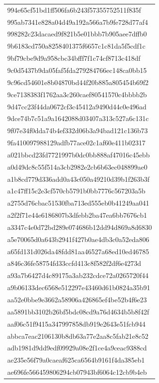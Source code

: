 \begin{tabular}{l}
994e65cf51bd1ff506fa6b243f57355752511f835f \\
995ab7341e828a04d49a192a566a7b9fe728d77af4 \\
998282c23dacaed9f821b5e01bbb7b905aee7dffb0 \\
9b6183cd750a8258401375f6657c1c81da5f5cdf1c \\
9bf79cbe9d9a958cbc34bfff7f1c74cf8713c418df \\
9c0d5437b9da05faf5fda279284766ec148ca0bb15 \\
9c96cd54601e8b04870bd44f20b885a805454b69f2 \\
9ce7138383f1762aa3c260caef80541570c4bbbb2b \\
9d47cc23f44da0672cf3c45412a9490d44c0e496ad \\
9dce74b7c51a9a1642088d03407a313c527a6c131c \\
9f07e34f0dda74b4ef332d06b3a94bad121c136b73 \\
9fa410097988129adfb77ace02c1af60e411b02317 \\
a021bbcd23fd7721997b0dc0bb888af47016c45ebb \\
a0d49dc8c55f514a3cb2982e2cb6b63ec048899ae0 \\
a1b8cd779d336add0a43c050a49210d39b1f263b3f \\
a1c47ff15c2e3cf570cb5791b0bb7776c567203a5b \\
a2755d76cbac51530fba713ed555eb0b41249aa041 \\
a2f2f71e44e6186807b3dfebb2ba47ea6bb7676cb1 \\
a3347c4e0d72bd289e074686b12dd94d869a8d6830 \\
a5e70065d0a643b2941f427b0ae4db3c0a52eda806 \\
a65fd131d026da48fdd81aa46527a68ed10ed46785 \\
a846c36fe58754fd33ccfd413c8f582f2df6e4273d \\
a93a7b6427d4c89175a3ab232cdce72a0265720f44 \\
a9b06133dec6568e512297e43460d61b0824a35b91 \\
aa52e0bbe9e3662a58906a426865ef4be52b4f6e23 \\
aa5891bb3102b26bf5bdc08cd9a76d4634b5b8f42f \\
aaf06c51f9415a347997858db919e2643e51fcb944 \\
abbca7eac2106130b8db63a77e2aa8c5fab21e8c52 \\
adb1981d9dd9edf09929a08e2f1ce4a9ceac9388cd \\
ae235e56f79a0caeaf625ca6564b9161f4da385eb1 \\
ae696fe566459806294cb07943bf6064c12cb9b4eb \\

\end{tabular}
